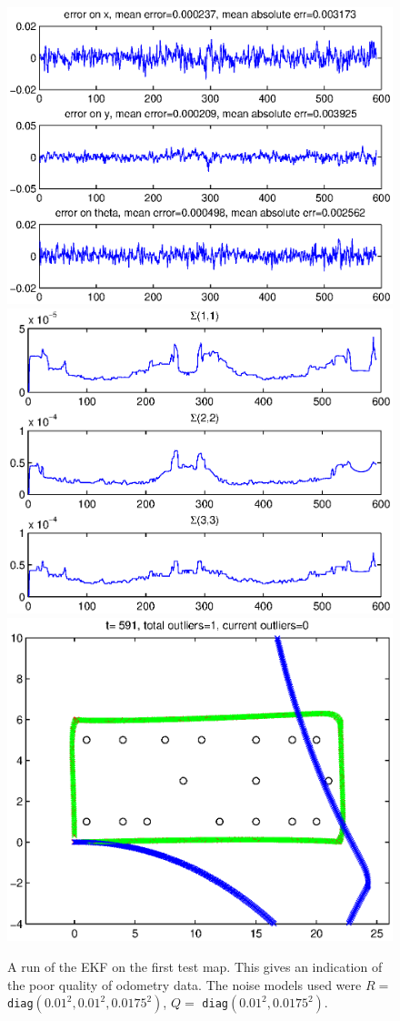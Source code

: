 \documentclass[a4paper,12pt]{article}
\begin{document}
\begin{figure}
  \centerline
  {
    \includegraphics[width=.43\textwidth]{figures/ekf/map1_seq_error}
    \includegraphics[width=.43\textwidth]{figures/ekf/map1_seq_sigma}
    \includegraphics[width=.43\textwidth]{figures/ekf/map1_seq_motion}
  }
  \caption{A run of the EKF on the first test map. This gives an indication of
    the poor quality of odometry data. The noise models used were
    $R=$ \texttt{diag}$(0.01^2, 0.01^2, 0.0175^2)$, $Q=$ \texttt{diag}$(0.01^2,
    0.0175^2)$.}
  \label{fig:map1}
\end{figure}
\end{document}
